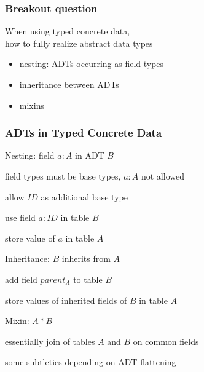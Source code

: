 \begin{frame}\frametitle{Breakout question}
When using typed concrete data,\\
how to fully realize abstract data types
\begin{itemize}
\item nesting: ADTs occurring as field types
\item inheritance between ADTs
\item mixins
\end{itemize}
\end{frame}

\begin{frame}\frametitle{ADTs in Typed Concrete Data}
\begin{blockitems}{Nesting: field $a:A$ in ADT $B$}
\item field types must be base types, $a:A$ not allowed
\item allow $ID$ as additional base type
\item use field $a:ID$ in table $B$
\item store value of $a$ in table $A$
\end{blockitems}

\begin{blockitems}{Inheritance: $B$ inherits from $A$}
\item add field $parent_A$ to table $B$
\item store values of inherited fields of $B$ in table $A$
\end{blockitems}

\begin{blockitems}{Mixin: $A*B$}
\item essentially join of tables $A$ and $B$ on common fields
\item some subtleties depending on ADT flattening
\end{blockitems}
\end{frame}

